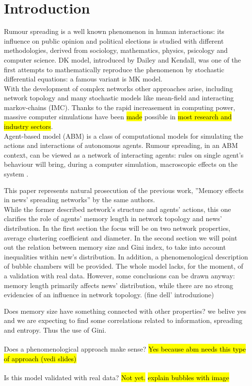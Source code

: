 \section{Introduction}
Rumour spreading is a well known phenomenon in human interactions:
its influence on public opinion\cite{publicoprumsp} and political elections \cite{politicalrumsp} is studied
with different methodologies, derived from sociology, mathematics,
physics, psicology and computer science.
DK model\cite{DKmodel}, introduced by Dailey and Kendall, was one of
the first attempts to mathematically reproduce the phenomenon by
stochastic differential equations: a famous variant is MK model\cite{MKmodel}.\\
With the development of complex networks other approaches arise,
including network topology and many stochastic models
like mean-field\cite{meanfield} and interacting markov-chains\cite{IMC} (IMC).
Thanks to the rapid increasement in computing power,
massive computer simulations have been \hl{made} possible in
\hl{most research and industry sectors}.\\
Agent-based model (ABM) is a class of computational models for
simulating the actions and interactions of autonomous agents\cite{Agentbased}.
Rumour spreading, in an ABM context, can be viewed as a network
of interacting agents: rules on single agent's behaviour
will bring, during a computer simulation, macroscopic
effects on the system \cite{Agentbased}.

This paper represents natural prosecution of the previous work,
''Memory effects in news' spreading networks'' by the same authors\cite{ourpaper}.\\
While the former described network's structure and agents' actions, this one clarifies
the role of agents' memory length in network topology and news' distribution.
In the first section the focus will be on two network properties, average clustering coefficient and diameter.
In the second section we will point out the relation between memory size
and Gini index, to take into account inequalities within new's distribution.
In addition, a phenomenological description of bubble chambers will be provided.
The whole model lacks, for the moment, of a validation with real data.
However, some conclusions can be drawn anyway: memory length primarily affects
news' distribution, while there are no strong evidencies of an influence in network topology.
(fine dell' introduzione)


Does memory size have something connected with other properties?
we belive yes and we are expecting to find some correlations related
to information, spreading and entropy. Thus the use of Gini.\\ \\
Does a phenomenological approach make sense? \hl{Yes because abm needs
this type of approach (vedi slides)}\\ \\
Is this model validated with real data? \hl{Not yet.}
\hl{explain bubbles with image}